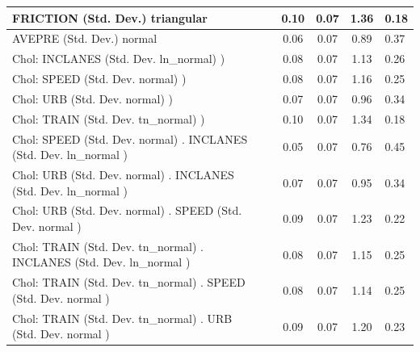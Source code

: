 \begin{table}
\begin{center}
\begin{tabular}{|l|l|c|c|c|l|}
			\hline
			FRICTION (Std. Dev.) triangular &  & 0.10 & 0.07 & 1.36 & 0.18 \\
			\hline
			AVEPRE (Std. Dev.) normal &  & 0.06 & 0.07 & 0.89 & 0.37 \\
			\hline
			 Chol: INCLANES (Std. Dev. ln_normal) ) &  & 0.08 & 0.07 & 1.13 & 0.26 \\
			\hline
			 Chol: SPEED (Std. Dev. normal) ) &  & 0.08 & 0.07 & 1.16 & 0.25 \\
			\hline
			 Chol: URB (Std. Dev. normal) ) &  & 0.07 & 0.07 & 0.96 & 0.34 \\
			\hline
			 Chol: TRAIN (Std. Dev. tn_normal) ) &  & 0.10 & 0.07 & 1.34 & 0.18 \\
			\hline
			 Chol: SPEED (Std. Dev. normal) . INCLANES (Std. Dev.   ln_normal ) &  & 0.05 & 0.07 & 0.76 & 0.45 \\
			\hline
			 Chol: URB (Std. Dev. normal) . INCLANES (Std. Dev.   ln_normal ) &  & 0.07 & 0.07 & 0.95 & 0.34 \\
			\hline
			 Chol: URB (Std. Dev. normal) . SPEED (Std. Dev.   normal ) &  & 0.09 & 0.07 & 1.23 & 0.22 \\
			\hline
			 Chol: TRAIN (Std. Dev. tn_normal) . INCLANES (Std. Dev.   ln_normal ) &  & 0.08 & 0.07 & 1.15 & 0.25 \\
			\hline
			 Chol: TRAIN (Std. Dev. tn_normal) . SPEED (Std. Dev.   normal ) &  & 0.08 & 0.07 & 1.14 & 0.25 \\
			\hline
			 Chol: TRAIN (Std. Dev. tn_normal) . URB (Std. Dev.   normal ) &  & 0.09 & 0.07 & 1.20 & 0.23 \\
			\hline
		\end{tabular}
	\end{center}
\end{table}